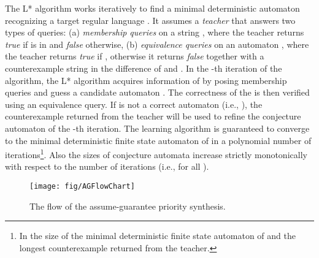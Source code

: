 \documentclass[10pt, a4paper, onecolumn, conference, compsocconf]{IEEEtran}
\begin{document}
The L* algorithm works iteratively to find a minimal deterministic automaton recognizing a target regular language . It assumes a \textit{teacher} that answers two types of queries: (a) \textit{membership queries} on a string ,  where the teacher returns \emph{true} if  is in  and \emph{false} otherwise, (b) \textit{equivalence queries} on an automaton , where the teacher returns \emph{true} if , otherwise it returns \emph{false} together with a counterexample string in the difference of  and .
In the -th iteration of the algorithm, the L* algorithm acquires information of  by posing membership queries and guess a candidate automaton . The correctness of the  is then verified using an equivalence query. If  is not a correct automaton (i.e., ), the counterexample returned from the teacher will be used to refine the conjecture automaton of the -th iteration. The learning algorithm is guaranteed to converge to the minimal deterministic finite state automaton of  in a polynomial number of iterations\footnote{In the size of the minimal deterministic finite state automaton of  and the longest counterexample returned from the teacher.}. Also the sizes of conjecture automata increase strictly monotonically with respect to the number of iterations (i.e.,  for all ).

\begin{figure}[t]
\centering
 \texttt{[image: fig/AGFlowChart]}
  \caption{The flow of the assume-guarantee priority synthesis.}
 \label{fig:agflow}
\end{figure}
\end{document}
